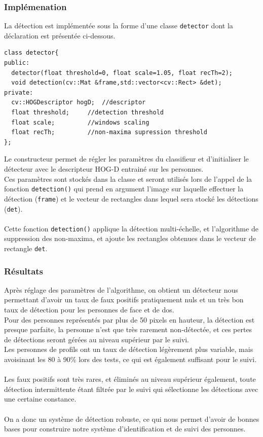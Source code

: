 \documentclass[12pt]{article}
\begin{document}
\subsubsection{Implémenation}
La détection est implémentée sous la forme d'une classe \verb!detector! dont la déclaration est présentée ci-dessous.\\
\begin{lstlisting}[frame=single]
class detector{
public:
  detector(float threshold=0, float scale=1.05, float recTh=2);
  void detection(cv::Mat &frame,std::vector<cv::Rect> &det);
private:
  cv::HOGDescriptor hogD;  //descriptor	
  float threshold;	   //detection threshold	
  float scale;		   //windows scaling	
  float recTh;		   //non-maxima supression threshold
};
\end{lstlisting}
Le constructeur permet de régler les paramètres du classifieur et d'initialiser le détecteur avec le descripteur HOG-D entrainé sur les personnes.\\
Ces paramètres sont stockés dans la classe et seront utilisés lors de l'appel de la fonction \verb!detection()! qui prend en argument l'image sur laquelle effectuer la détection (\verb!frame!) et le vecteur de rectangles dans lequel sera stocké les détections (\verb!det!).\\
\\
Cette fonction \verb!detection()! applique la détection multi-échelle, et l'algorithme de suppression des non-maxima, et ajoute les rectangles obtenues dans le vecteur de rectangle \verb!det!.
\subsubsection{Résultats}
Après réglage des paramètres de l'algorithme, on obtient un détecteur nous permettant d'avoir un taux de faux positifs pratiquement nuls et un très bon taux de détection pour les personnes de face et de dos.\\
Pour des personnes représentés par plus de 50 pixels en hauteur, la détection est presque parfaite, la personne n'est que très rarement non-détectée, et ces pertes de détections seront gérées au niveau supérieur par le suivi.\\
Les personnes de profils ont un taux de détection légèrement plus variable, mais avoisinant les 80 à 90\% lors des tests, ce qui est également suffisant pour le suivi.\\
\\
Les faux positifs sont très rares, et éliminés au niveau supérieur également, toute détection intermittente étant filtrée par le suivi qui sélectionne les détections avec une certaine constance.\\
\\
On a donc un système de détection robuste, ce qui nous permet d'avoir de bonnes bases pour construire notre système d'identification et de suivi des personnes.
\pagebreak
\end{document}
